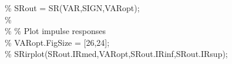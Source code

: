 \hspace{1mm}\hspace{5mm} \hspace{5mm} \hspace{5mm} \hspace{5mm} \hspace{5mm} \textcolor{matlabgreen}{\% SRout = SR(VAR,SIGN,VARopt); }\\ 
\hspace{1mm}\hspace{5mm} \hspace{5mm} \hspace{5mm} \hspace{5mm} \hspace{5mm} \textcolor{matlabgreen}{\%  }\\ 
\hspace{1mm}\hspace{5mm} \hspace{5mm} \hspace{5mm} \hspace{5mm} \hspace{5mm} \textcolor{matlabgreen}{\% }\textcolor{matlabgreen}{\% Plot impulse responses }\\ 
\hspace{1mm}\hspace{5mm} \hspace{5mm} \hspace{5mm} \hspace{5mm} \hspace{5mm} \textcolor{matlabgreen}{\% VARopt.FigSize = [26,24]; }\\ 
\hspace{1mm}\hspace{5mm} \hspace{5mm} \hspace{5mm} \hspace{5mm} \hspace{5mm} \textcolor{matlabgreen}{\% SRirplot(SRout.IRmed,VARopt,SRout.IRinf,SRout.IRsup); }\\ 
\hspace{1mm}\hspace{5mm} \hspace{5mm} \hspace{5mm} \hspace{5mm} \hspace{5mm}  \\ 
\hspace{1mm}\hspace{5mm} \hspace{5mm} \hspace{5mm} \hspace{5mm} \hspace{5mm}  \\ 
